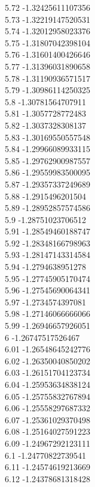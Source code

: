 {5.72	-1.32425611107356\\
5.73	-1.32219147520531\\
5.74	-1.32012958023376\\
5.75	-1.31807042398104\\
5.76	-1.31601400426646\\
5.77	-1.31396031890658\\
5.78	-1.31190936571517\\
5.79	-1.30986114250325\\
5.8	-1.30781564707911\\
5.81	-1.3057728772483\\
5.82	-1.3037328308137\\
5.83	-1.30169550557548\\
5.84	-1.29966089933115\\
5.85	-1.29762900987557\\
5.86	-1.29559983500095\\
5.87	-1.29357337249689\\
5.88	-1.2915496201504\\
5.89	-1.28952857574586\\
5.9	-1.28751023706512\\
5.91	-1.28549460188747\\
5.92	-1.28348166798963\\
5.93	-1.28147143314584\\
5.94	-1.2794638951278\\
5.95	-1.27745905170474\\
5.96	-1.27545690064341\\
5.97	-1.2734574397081\\
5.98	-1.27146066666066\\
5.99	-1.26946657926051\\
6	-1.26747517526467\\
6.01	-1.26548645242776\\
6.02	-1.26350040850202\\
6.03	-1.26151704123734\\
6.04	-1.25953634838124\\
6.05	-1.25755832767894\\
6.06	-1.25558297687332\\
6.07	-1.25361029370498\\
6.08	-1.25164027591223\\
6.09	-1.24967292123111\\
6.1	-1.24770822739541\\
6.11	-1.24574619213669\\
6.12	-1.24378681318428\\
}
